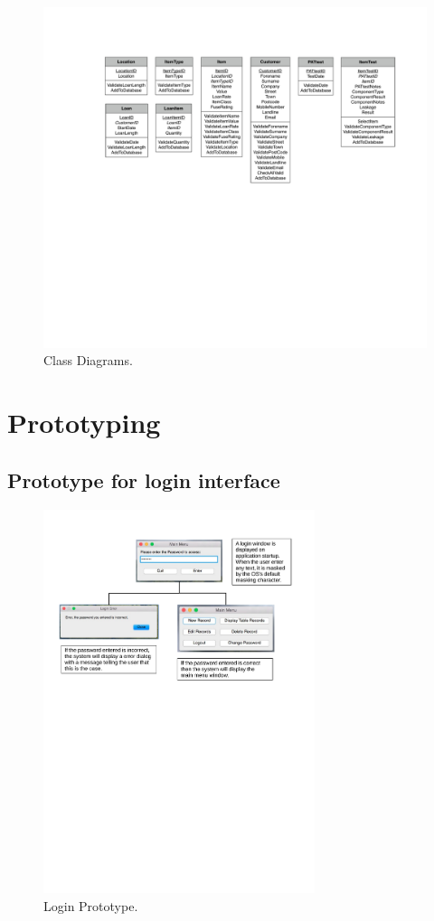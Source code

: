 \begin{landscape}
\begin{figure}[H]
    \centerline{\includegraphics[width=450px]{./Design/Class_Definitions/Class_definitions.pdf}}
    \caption{Class Diagrams.} \label{fig:relationship_diagram}
\end{figure}


\end{landscape}

\newpage

\section{Prototyping}

\subsection{\textbf{Prototype for login interface}}
\begin{figure}[H]
    \centerline{\includegraphics[width=300px]{./Design/Prototyping/Login_prototyping.pdf}}
    \caption{Login Prototype.} \label{fig:relationship_diagram}
\end{figure}

